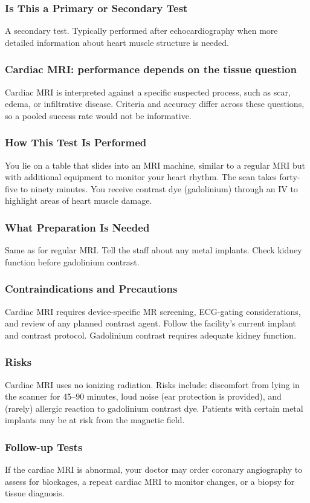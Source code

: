 \subsubsection*{Is This a Primary or Secondary Test}
A secondary test. Typically performed after echocardiography when more detailed information about heart muscle structure is needed.

\subsubsection*{Cardiac MRI: performance depends on the tissue question}
Cardiac MRI is interpreted against a specific suspected process, such as scar, edema, or infiltrative disease. Criteria and accuracy differ across these questions, so a pooled success rate would not be informative.

\subsubsection*{How This Test Is Performed}
You lie on a table that slides into an MRI machine, similar to a regular MRI but with additional equipment to monitor your heart rhythm. The scan takes forty-five to ninety minutes. You receive contrast dye (gadolinium) through an IV to highlight areas of heart muscle damage.

\subsubsection*{What Preparation Is Needed}
Same as for regular MRI. Tell the staff about any metal implants. Check kidney function before gadolinium contrast.

\subsubsection*{Contraindications and Precautions}
Cardiac MRI requires device-specific MR screening, ECG-gating considerations, and review of any planned contrast agent. Follow the facility's current implant and contrast protocol. Gadolinium contrast requires adequate kidney function.

\subsubsection*{Risks}
Cardiac MRI uses no ionizing radiation. Risks include: discomfort from lying in the scanner for 45--90 minutes, loud noise (ear protection is provided), and (rarely) allergic reaction to gadolinium contrast dye. Patients with certain metal implants may be at risk from the magnetic field.

\subsubsection*{Follow-up Tests}
If the cardiac MRI is abnormal, your doctor may order coronary angiography to assess for blockages, a repeat cardiac MRI to monitor changes, or a biopsy for tissue diagnosis.
\clearpage
